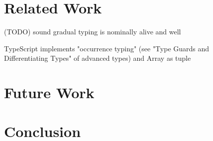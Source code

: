 \chapter{Related Work}

(TODO) sound gradual typing is nominally alive and well


TypeScript implements "occurrence typing" (see "Type Guards and Differentiating Types" of advanced types) and Array as tuple 
\renewcommand{\thechapter}{5}

\chapter{Future Work}

\renewcommand{\thechapter}{6}
\chapter{Conclusion}